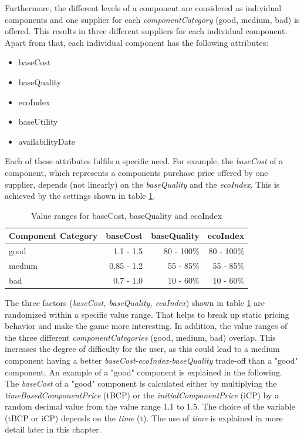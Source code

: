 Furthermore, the different levels of a component are considered as individual components and one supplier for each \textit{componentCategory} (good, medium, bad) is offered. This results in three different suppliers for each individual component.\\
Apart from that, each individual component has the following attributes:
\begin{itemize}
    \item baseCost
    \item baseQuality
    \item ecoIndex
    \item baseUtility
    \item availabilityDate
\end{itemize}
Each of these attributes fulfils a specific need. For example, the \textit{baseCost} of a component, which represents a components purchase price offered by one supplier, depends (not linearly) on the \textit{baseQuality} and the \textit{ecoIndex}. This is achieved by the settings shown in table \ref{component_price_calculation}.
    \begin{table}[ht]
    \centering
    \begin{tabular}{|l|r|r|r|}
    \hline
    Component Category & baseCost & baseQuality & ecoIndex \\
    \hline
    good & 1.1 - 1.5 & 80 - 100\% & 80 - 100\% \\
    medium & 0.85 - 1.2 & 55 - 85\% & 55 - 85\%\\
    bad  & 0.7 - 1.0 & 10 - 60\% & 10 - 60\%\\
    \hline
    \end{tabular}
    \caption{Value ranges for baseCost, baseQuality and ecoIndex}
    \label{component_price_calculation}
    \end{table}
\newline
The three factors (\textit{baseCost, baseQuality, ecoIndex}) shown in table \ref{component_price_calculation} are randomized within a specific value range. That helps to break up static pricing behavior and make the game more interesting. In addition, the value ranges of the three different \textit{componentCategories} (good, medium, bad) overlap. This increases the degree of difficulty for the user, as this could lead to a medium component having a better \textit{baseCost-ecoIndex-baseQuality} trade-off than a "good" component. An example of a "good" component is explained in the following.\\
The \textit{baseCost} of a "good" component is calculated either by multiplying the \textit{timeBasedComponentPrice} (\gls{tBCP}) or the \textit{initialComponentPrice} (\gls{iCP}) by a random decimal value from the value range 1.1 to 1.5. The choice of the variable (tBCP or iCP) depends on the \textit{time} (t). The use of \textit{time} is explained in more detail later in this chapter.

